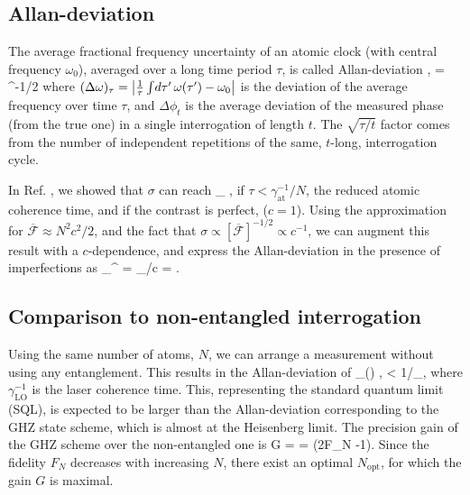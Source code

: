 \subsection{Allan-deviation}
The average fractional frequency uncertainty of an atomic clock (with central
frequency $\omega_0$), averaged over a long time period $\tau$, is called
Allan-deviation \cite{Kessler2014},
\bal
	\sigma =  \approx
	 
	\approx
	^{-1/2}\quad\quad
\eal
where $(\Delta \omega)_\tau =
\left|\frac{1}{\tau}\int\! d\tau'\,\omega(\tau') - \omega_0\right|$ is the
deviation of the average frequency over time $\tau$, and $\Delta\phi_t$ is
the average deviation of the measured phase (from the true one) in a single
interrogation of length $t$. The $\sqrt{\tau/t}$ factor comes from the number of
independent repetitions of the same, $t$-long, interrogation cycle.

In Ref. \cite{Komar2014}, we showed that $\sigma$ can reach
\bel
	\sigma_ \approx {} \frac{\sqrt{\log
	N}}{N},
\eel 
if $\tau < \gamma_\mathrm{at}^{-1}/N$, the reduced atomic coherence time, and if
the contrast is perfect, ($c=1$). Using the approximation for
$\overline{\mathcal{F}}\approx N^2 c^2/2$,  and the fact that $\sigma \propto
[\overline{\mathcal{F}}]^{-1/2}\propto c^{-1}$, we can augment this result with
a $c$-dependence, and express the Allan-deviation in the presence of
imperfections as
\bel
	\sigma_^ = \sigma_/c = \frac{\sqrt{\log N}}{N}.
\eel


\subsection{Comparison to non-entangled interrogation}
Using the same number of atoms, $N$, we can arrange a measurement without using
any entanglement. This results in the Allan-deviation of
\bel
\label{eq:sigma_single}
	\sigma_(\tau) \approx {},\qquad
	\quad \tau < 1/\gamma_,
\eel
where $\gamma_\mathrm{LO}^{-1}$ is the laser coherence time.
This, representing the standard quantum limit (SQL), is expected to be larger
than the Allan-deviation corresponding to the GHZ state scheme, which is almost
at the Heisenberg limit. The precision gain of the GHZ scheme over the
non-entangled one is
\bel
\label{eq:gain}
	G =  =
	(2F_N -1).
\eel
Since the fidelity $F_N$ decreases with increasing $N$, there exist an optimal
$N_\mathrm{opt}$, for which the gain $G$ is maximal.

